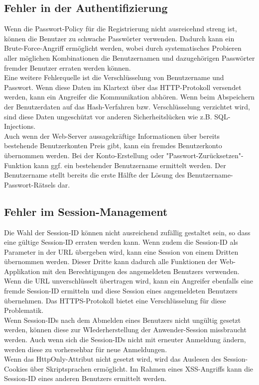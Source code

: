 \subsection{Fehler in der Authentifizierung}
Wenn die Passwort-Policy für die Registrierung nicht ausreicehnd streng ist, können die Benutzer zu schwache Passwörter verwenden. Dadurch kann ein Brute-Force-Angriff ermöglicht werden, wobei durch systematisches Probieren aller möglichen Kombinationen die Benutzernamen und dazugehörigen Passwörter fremder Benutzer erraten werden können.\\
Eine weitere Fehlerquelle ist die Verschlüsselung von Benutzername und Passwort. Wenn diese Daten im Klartext über das HTTP-Protokoll versendet werden, kann ein Angreifer die Kommunikation abhören. Wenn beim Abspeichern der Benutzerdaten auf das Hash-Verfahren bzw. Verschlüsselung verzichtet wird, sind diese Daten ungeschützt vor anderen Sicherheitslücken wie z.B. SQL-Injections.\\
Auch wenn der Web-Server aussagekräftige Informationen über bereits bestehende Benutzerkonten Preis gibt, kann ein fremdes Benutzerkonto übernommen werden. Bei der Konto-Erstellung oder "Passwort-Zurücksetzen"-Funktion kann ggf. ein bestehender Benutzername ermittelt werden. Der Benutzername stellt bereits die erste Hälfte der Lösung des Benutzername-Passwort-Rätsels dar.

\subsection{Fehler im Session-Management}
Die Wahl der Session-ID können nicht ausreichend zufällig gestaltet sein, so dass eine gültige Session-ID erraten werden kann. Wenn zudem die Session-ID als Parameter in der URL übergeben wird, kann eine Session von einem Dritten übernommen werden. Dieser Dritte kann dadurch alle Funktionen der Web-Applikation mit den Berechtigungen des angemeldeten Benutzers verwenden. Wenn die URL unverschlüsselt übertragen wird, kann ein Angreifer ebenfalls eine fremde Session-ID ermitteln und diese Session eines angemeldeten Benutzers übernehmen. Das HTTPS-Protokoll bietet eine Verschlüsselung für diese Problematik.\\
Wenn Session-IDs nach dem Abmelden eines Benutzers nicht ungültig gesetzt werden, können diese zur WIederherstellung der Anwender-Session missbraucht werden. Auch wenn sich die Session-IDs nicht mit erneuter Anmeldung ändern, werden diese zu vorhersehbar für neue Anmeldungen.\\
Wenn das HttpOnly-Attribut nicht gesetzt wird, wird das Auslesen des Session-Cookies über Skriptsprachen ermöglicht. Im Rahmen eines XSS-Angriffs kann die Session-ID eines anderen Benutzers ermittelt werden. 

